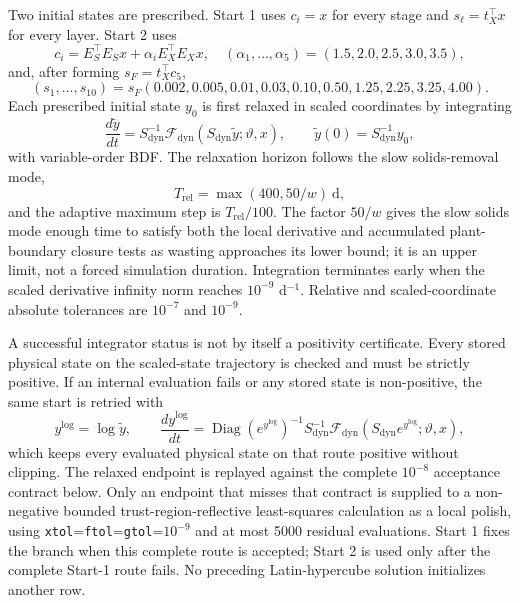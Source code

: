 \documentclass[a4paper,fleqn]{cas-sc}
\newcommand{\diag}{\operatorname{Diag}}
\begin{document}
Two initial states are prescribed. Start 1 uses $c_i=x$ for every stage and $s_\ell=t_X^\top x$ for every layer. Start 2 uses
\begin{equation}
c_i=E_S^\top E_Sx+\alpha_iE_X^\top E_Xx,
\quad (\alpha_1,\ldots,\alpha_5)=(1.5,2.0,2.5,3.0,3.5),
\end{equation}
and, after forming $s_F=t_X^\top c_5$,
\begin{equation}
(s_1,\ldots,s_{10})=s_F(0.002,0.005,0.01,0.03,0.10,0.50,1.25,2.25,3.25,4.00).
\end{equation}
Each prescribed initial state $y_0$ is first relaxed in scaled coordinates by integrating
\begin{equation}
\frac{d\widetilde y}{dt}=S_{\mathrm{dyn}}^{-1}\mathcal F_{\mathrm{dyn}}(S_{\mathrm{dyn}}\widetilde y;\vartheta,x),
\qquad \widetilde y(0)=S_{\mathrm{dyn}}^{-1}y_0,
\end{equation}
with variable-order BDF. The relaxation horizon follows the slow solids-removal mode,
\begin{equation}
T_{\mathrm{rel}}=\max(400,50/w)\ \mathrm{d},
\end{equation}
and the adaptive maximum step is $T_{\mathrm{rel}}/100$. The factor $50/w$ gives the slow solids mode enough time to satisfy both the local derivative and accumulated plant-boundary closure tests as wasting approaches its lower bound; it is an upper limit, not a forced simulation duration. Integration terminates early when the scaled derivative infinity norm reaches $10^{-9}$ d$^{-1}$. Relative and scaled-coordinate absolute tolerances are $10^{-7}$ and $10^{-9}$.

A successful integrator status is not by itself a positivity certificate. Every stored physical state on the scaled-state trajectory is checked and must be strictly positive. If an internal evaluation fails or any stored state is non-positive, the same start is retried with
\begin{equation}
y^{\log}=\log\widetilde y,
\qquad
\frac{dy^{\log}}{dt}=\diag(e^{y^{\log}})^{-1}S_{\mathrm{dyn}}^{-1}
\mathcal F_{\mathrm{dyn}}(S_{\mathrm{dyn}}e^{y^{\log}};\vartheta,x),
\end{equation}
which keeps every evaluated physical state on that route positive without clipping. The relaxed endpoint is replayed against the complete $10^{-8}$ acceptance contract below. Only an endpoint that misses that contract is supplied to a non-negative bounded trust-region-reflective least-squares calculation as a local polish, using \texttt{xtol}=\texttt{ftol}=\texttt{gtol}=$10^{-9}$ and at most 5000 residual evaluations. Start 1 fixes the branch when this complete route is accepted; Start 2 is used only after the complete Start-1 route fails. No preceding Latin-hypercube solution initializes another row.
\end{document}
